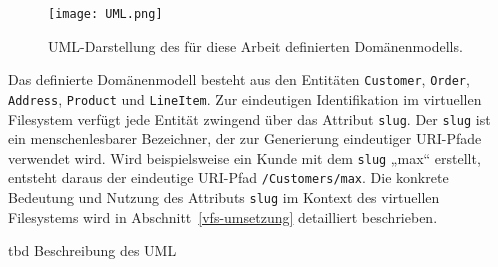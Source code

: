 \begin{figure}[H]
  \centering
  \texttt{[image: UML.png]}
  \caption{UML-Darstellung des für diese Arbeit definierten Domänenmodells.}
  \label{fig:uml_modell}
\end{figure}

Das definierte Domänenmodell besteht aus den Entitäten \texttt{Customer}, \texttt{Order}, \texttt{Address}, \texttt{Product} und \texttt{LineItem}. Zur eindeutigen Identifikation im virtuellen Filesystem verfügt jede Entität zwingend über das Attribut \texttt{slug}. Der \texttt{slug} ist ein menschenlesbarer Bezeichner, der zur Generierung eindeutiger URI-Pfade verwendet wird. Wird beispielsweise ein Kunde mit dem \texttt{slug} „max“ erstellt, entsteht daraus der eindeutige URI-Pfad \texttt{/Customers/max}. Die konkrete Bedeutung und Nutzung des Attributs \texttt{slug} im Kontext des virtuellen Filesystems wird in Abschnitt~\ref{vfs-umsetzung} detailliert beschrieben.

tbd Beschreibung des UML